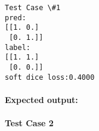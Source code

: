 \documentclass[11pt]{article}
\newenvironment{Shaded}{}{}
\newcommand{\FloatTok}[1]{\textcolor[rgb]{0.25,0.63,0.44}{{#1}}}
\newcommand{\CommentTok}[1]{\textcolor[rgb]{0.38,0.63,0.69}{\textit{{#1}}}}
\newcommand{\NormalTok}[1]{{#1}}
\begin{document}
    \begin{Verbatim}[commandchars=\\\{\}]
Test Case \#1
pred:
[[1. 0.]
 [0. 1.]]
label:
[[1. 1.]
 [0. 0.]]
soft dice loss:0.4000

    \end{Verbatim}

    \hypertarget{expected-output}{%
\paragraph{Expected output:}\label{expected-output}}

\begin{Shaded}
\end{Shaded}

    \hypertarget{test-case-2}{%
\paragraph{Test Case 2}\label{test-case-2}}
\end{document}
